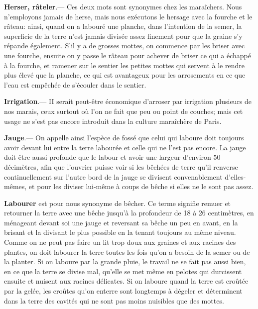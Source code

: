 \documentclass[10pt,a4paper]{book}
\begin{document}
\textbf{Herser, râteler}.--- Ces deux mots sont synonymes chez les maraîchers. Nous n'employons jamais de herse, mais nous exécutons le hersage avec la fourche et le râteau: ainsi, quand on a labouré une planche, dans l'intention de la semer, la superficie de la terre n'est jamais divisée assez finement pour que la graine s'y répande également. S'il y a de grosses mottes, on commence par les briser avec une fourche, ensuite on y passe le râteau pour achever de briser ce qui a échappé à la fourche, et ramener sur le sentier les petites mottes qui servent à le rendre plus élevé que la planche, ce qui est avantageux pour les arrosements en ce que l'eau est empêchée de s'écouler dans le sentier.

\textbf{Irrigation}.--- II serait peut-être économique d'arroser par irrigation plusieurs de nos marais, ceux surtout où l'on ne fait que peu ou point de couches; mais cet usage ne s'est pas encore introduit dans la culture maraîchère de Paris.

\textbf{Jauge}.--- On appelle ainsi l'espèce de fossé que celui qui laboure doit toujours avoir devant lui entre la terre labourée et celle qui ne l'est pas encore. La jauge doit être aussi profonde que le labour et avoir une largeur d'environ 50 décimètres, afin que l'ouvrier puisse voir si les bêchées de terre qu'il renverse continuellement sur l'autre bord de la jauge se divisent convenablement d'elles-mêmes, et pour les diviser lui-même à coups de bêche si elles ne le sont pas assez.

\textbf{Labourer} est pour nous synonyme de bêcher. Ce terme signifie remuer et retourner la terre avec une bêche jusqu'à la profondeur de 18 à 26 centimètres, en ménageant devant soi une jauge et reversant sa bêche un peu en avant, en la brisant et la divisant le plus possible en la tenant toujours au même niveau. Comme on ne peut pas faire un lit trop doux aux graines et aux racines des plantes, on doit labourer la terre toutes les fois qu'on a besoin de la semer ou de la planter. Si on laboure par la grande pluie, le travail ne se fait pas aussi bien, en ce que la terre se divise mal, qu'elle se met même en pelotes qui durcissent ensuite et nuisent aux racines délicates. Si on laboure quand la terre est croûtée par la gelée, les croûtes qu'on enterre sont longtemps à dégeler et déterminent dans la terre des cavités qui ne sont pas moins nuisibles que des mottes.
\end{document}
